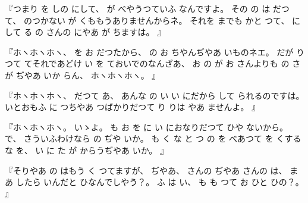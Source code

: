『つまり
を
しの
にして、
%
が
べやうつていふ
なんですよ。
%
その
の
は
だつて、
%
のつかない
が
くももうありませんからネ。
%
それを
までも
かと
つて、
%
にして
る
の
さんの
にやあ
が
ちますは。
』

『ホヽホヽホヽ、
%
を
お
だつたから、
%
の
お
ちやんぢやあ
いものネエ。
%
だが
り
つて
てそれであどけ
い
を
ておいでのなんざあ、
%
お
の
が
お
さんよりも
の
さが
ぢやあ
いか
らん、
%
ホヽホヽホヽ。
』

『ホヽホヽホヽ、
%
だつて
あ、
%
あんな
の
い
い
にだから
して
られるのですは。
%
いとおもふ
に
つちやあ
つばかりだつて
り
りは
やあ
ませんよ。
』

『ホヽホヽホヽ。
%
いゝよ。
%
も
お
を
に
い
におなりだつて
ひや
ないから。
%
で、
%
さういふわけなら
の
ぢや
いか。
%
も
く
な
と
つ
の
を
べあつて
を
くする
な
を、
%
い
に
た
が
からうぢやあ
いか。
』

『そりやあ
の
はもう
く
つてますが、
%
ぢやあ、
%
さんの
ぢやあ
さんの
は、
%
まあ
したら
いんだと
ひなんでしやう？。
%
ふ
は
い、
%
も
も
つて
お
ひと
ひの？。
』

